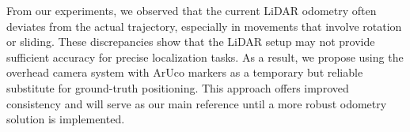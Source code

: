 From our experiments, we observed that the current LiDAR odometry often deviates from the actual trajectory, especially in movements that involve rotation or sliding. These discrepancies show that the LiDAR setup may not provide sufficient accuracy for precise localization tasks. As a result, we propose using the overhead camera system with ArUco markers as a temporary but reliable substitute for ground-truth positioning. This approach offers improved consistency and will serve as our main reference until a more robust odometry solution is implemented.

